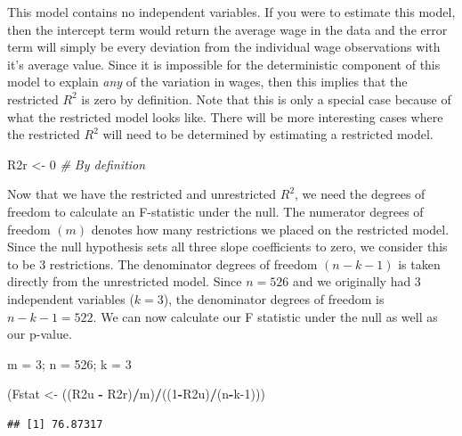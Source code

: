 \documentclass[
]{book}
\newenvironment{Shaded}{\begin{snugshade}}{\end{snugshade}}
\newcommand{\CommentTok}[1]{\textcolor[rgb]{0.56,0.35,0.01}{\textit{#1}}}
\newcommand{\DecValTok}[1]{\textcolor[rgb]{0.00,0.00,0.81}{#1}}
\newcommand{\NormalTok}[1]{#1}
\newcommand{\OtherTok}[1]{\textcolor[rgb]{0.56,0.35,0.01}{#1}}
\newcommand{\SpecialCharTok}[1]{\textcolor[rgb]{0.81,0.36,0.00}{\textbf{#1}}}
\begin{document}
This model contains no independent variables. If you were to estimate this model, then the intercept term would return the average wage in the data and the error term will simply be every deviation from the individual wage observations with it's average value. Since it is impossible for the deterministic component of this model to explain \emph{any} of the variation in wages, then this implies that the restricted \(R^2\) is zero by definition. Note that this is only a special case because of what the restricted model looks like. There will be more interesting cases where the restricted \(R^2\) will need to be determined by estimating a restricted model.

\begin{Shaded}
\begin{Highlighting}[]
\NormalTok{R2r }\OtherTok{\textless{}{-}} \DecValTok{0} \CommentTok{\# By definition}
\end{Highlighting}
\end{Shaded}

Now that we have the restricted and unrestricted \(R^2\), we need the degrees of freedom to calculate an F-statistic under the null. The numerator degrees of freedom \((m)\) denotes how many restrictions we placed on the restricted model. Since the null hypothesis sets all three slope coefficients to zero, we consider this to be 3 restrictions. The denominator degrees of freedom \((n-k-1)\) is taken directly from the unrestricted model. Since \(n=526\) and we originally had 3 independent variables (\(k=3\)), the denominator degrees of freedom is \(n-k-1=522\). We can now calculate our F statistic under the null as well as our p-value.

\begin{Shaded}
\begin{Highlighting}[]
\NormalTok{m }\OtherTok{=} \DecValTok{3}\NormalTok{; n }\OtherTok{=} \DecValTok{526}\NormalTok{; k }\OtherTok{=} \DecValTok{3}

\NormalTok{(Fstat }\OtherTok{\textless{}{-}}\NormalTok{ ((R2u }\SpecialCharTok{{-}}\NormalTok{ R2r)}\SpecialCharTok{/}\NormalTok{m)}\SpecialCharTok{/}\NormalTok{((}\DecValTok{1}\SpecialCharTok{{-}}\NormalTok{R2u)}\SpecialCharTok{/}\NormalTok{(n}\SpecialCharTok{{-}}\NormalTok{k}\DecValTok{{-}1}\NormalTok{)))}
\end{Highlighting}
\end{Shaded}

\begin{verbatim}
## [1] 76.87317
\end{verbatim}
\end{document}
